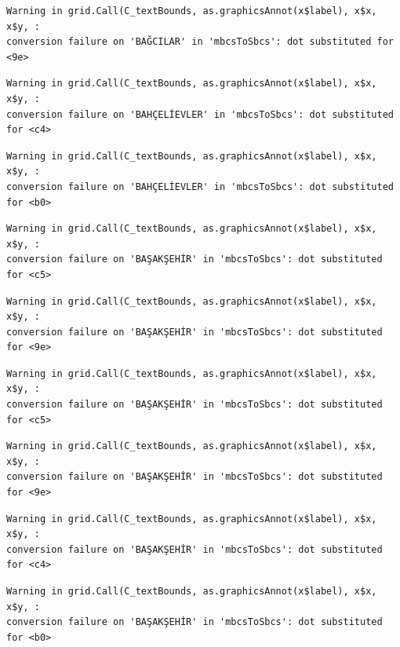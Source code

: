 \documentclass[
  11pt,
  a4paper,
  DIV=11,
  numbers=noendperiod]{scrartcl}
\begin{document}
\begin{verbatim}
Warning in grid.Call(C_textBounds, as.graphicsAnnot(x$label), x$x, x$y, :
conversion failure on 'BAĞCILAR' in 'mbcsToSbcs': dot substituted for <9e>
\end{verbatim}

\begin{verbatim}
Warning in grid.Call(C_textBounds, as.graphicsAnnot(x$label), x$x, x$y, :
conversion failure on 'BAHÇELİEVLER' in 'mbcsToSbcs': dot substituted for <c4>
\end{verbatim}

\begin{verbatim}
Warning in grid.Call(C_textBounds, as.graphicsAnnot(x$label), x$x, x$y, :
conversion failure on 'BAHÇELİEVLER' in 'mbcsToSbcs': dot substituted for <b0>
\end{verbatim}

\begin{verbatim}
Warning in grid.Call(C_textBounds, as.graphicsAnnot(x$label), x$x, x$y, :
conversion failure on 'BAŞAKŞEHİR' in 'mbcsToSbcs': dot substituted for <c5>
\end{verbatim}

\begin{verbatim}
Warning in grid.Call(C_textBounds, as.graphicsAnnot(x$label), x$x, x$y, :
conversion failure on 'BAŞAKŞEHİR' in 'mbcsToSbcs': dot substituted for <9e>
\end{verbatim}

\begin{verbatim}
Warning in grid.Call(C_textBounds, as.graphicsAnnot(x$label), x$x, x$y, :
conversion failure on 'BAŞAKŞEHİR' in 'mbcsToSbcs': dot substituted for <c5>
\end{verbatim}

\begin{verbatim}
Warning in grid.Call(C_textBounds, as.graphicsAnnot(x$label), x$x, x$y, :
conversion failure on 'BAŞAKŞEHİR' in 'mbcsToSbcs': dot substituted for <9e>
\end{verbatim}

\begin{verbatim}
Warning in grid.Call(C_textBounds, as.graphicsAnnot(x$label), x$x, x$y, :
conversion failure on 'BAŞAKŞEHİR' in 'mbcsToSbcs': dot substituted for <c4>
\end{verbatim}

\begin{verbatim}
Warning in grid.Call(C_textBounds, as.graphicsAnnot(x$label), x$x, x$y, :
conversion failure on 'BAŞAKŞEHİR' in 'mbcsToSbcs': dot substituted for <b0>
\end{verbatim}
\end{document}
